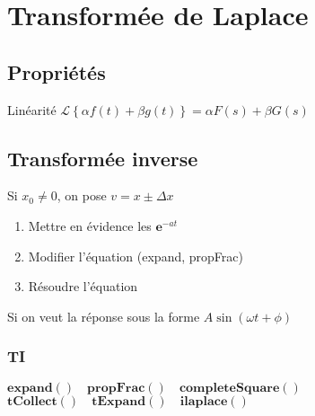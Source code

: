 \section{Transformée de Laplace}

\subsection{Propriétés}
\noindent
Linéarité \hspace{1em}\(\mathcal{L}\left\{\alpha f(t)+\beta g(t)\right\}= \alpha F(s) + \beta G(s)\)

\subsection{Transformée inverse}

Si $x_0 \neq 0$, on pose \(v=x\pm \Delta x\)\\\raggedright
\begin{enumerate}[nosep]
    \item Mettre en évidence les \(\mathbf{e}^{-at}\)
    \item Modifier l'équation (expand, propFrac)
    \item Résoudre l'équation
\end{enumerate}
Si on veut la réponse sous la forme \(A\sin(\omega t+\phi)\)\\\raggedright

\subsubsection{TI}
\centering
\( \mathbf{expand}() \hspace{1em} \mathbf{propFrac}() \hspace{1em} \mathbf{completeSquare}() \)\\
\(
    \mathbf{tCollect}()\hspace{1em}    \mathbf{tExpand}()\hspace{1em}    \mathbf{ilaplace}() 
\)\\
\raggedright